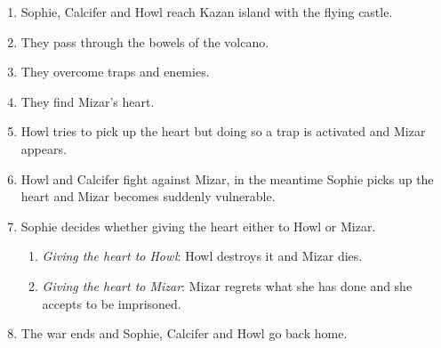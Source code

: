 \begin{enumerate}
  \begin{enumerate}
  \item Sophie, Calcifer and Howl reach Kazan island with the flying castle.
    
  \item They pass through the bowels of the volcano.
    
  \item They overcome traps and enemies.
    
  \item They find Mizar's heart.
    
  \item Howl tries to pick up the heart but doing so a trap is activated and Mizar appears.
    
    
  \item Howl and Calcifer fight against Mizar, in the meantime Sophie picks up the heart and Mizar becomes suddenly vulnerable.
    
  \item Sophie decides whether giving the heart either to Howl or Mizar.
    
    \begin{enumerate}
    \item \textit{Giving the heart to Howl}: Howl destroys it and Mizar dies.
      
    \item \textit{Giving the heart to Mizar}: Mizar regrets what she has done and she accepts to be imprisoned.
    \end{enumerate}
    
  \item The war ends and Sophie, Calcifer and Howl go back home.
  \end{enumerate}

\end{enumerate}
